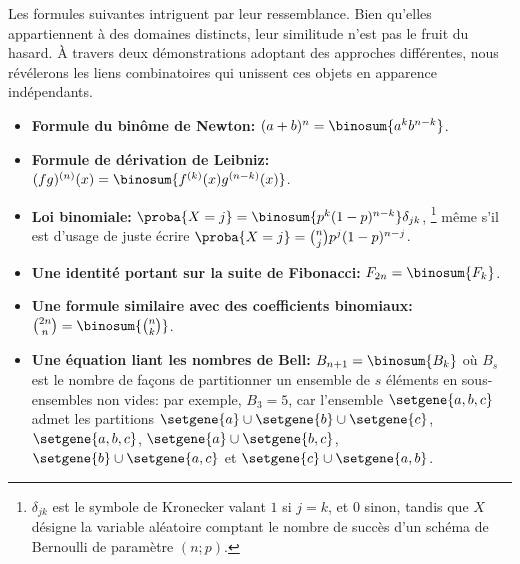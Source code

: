 Les formules suivantes intriguent par leur ressemblance. Bien qu'elles appartiennent à des domaines distincts, leur similitude n’est pas le fruit du hasard. À travers deux démonstrations adoptant des approches différentes, nous révélerons les liens combinatoires qui unissent ces objets en apparence indépendants.
%
\begin{itemize}
    \item \textbf{Formule du binôme de Newton:}
    $(a + b)^n = \binosum{a^k b^{n-k}}$.


    \item \textbf{Formule de dérivation de Leibniz:}
    $(fg)^{(n)}(x) = \binosum{f^{(k)}(x) g^{(n-k)}(x)}$.


    \item \textbf{Loi binomiale:}
    $\proba{X = j} = \binosum{p^k (1 - p)^{n-k}} \delta_{jk}$,%
    \footnote{
    	$\delta_{jk}$ est le symbole de Kronecker valant $1$ si $j=k$, et $0$ sinon,
		tandis que
		$X$ désigne la variable aléatoire comptant le nombre de succès d'un schéma de Bernoulli de paramètre $(n ; p)$.
    }
    même s'il est d'usage de juste écrire
    $\proba{X = j} =\binom{n}{j} p^j (1 - p)^{n-j}$.


    \item \textbf{Une identité portant sur la suite de Fibonacci:}
    $F_{2n} = \binosum{F_k}$.


    \item \textbf{Une formule similaire avec des coefficients binomiaux:}
    $\binom{2n}{n} = \binosum{\binom{n}{k}}$.


    \item \textbf{Une équation liant les nombres de Bell:}
    $B_{n+1} = \binosum{B_k}$ où $B_s$ est le nombre de façons de partitionner un ensemble de $s$ éléments en sous-ensembles non vides:
	par exemple,
	$B_3 = 5$,
	car l'ensemble $\setgene{ a , b , c }$ admet les partitions
	$\setgene{ a } \cup \setgene{ b } \cup \setgene{ c }$,
	$\setgene{ a , b , c }$,
	$\setgene{ a } \cup \setgene{ b , c }$,
	$\setgene{ b } \cup \setgene{ a , c }$ et
	$\setgene{ c } \cup \setgene{ a , b }$.
\end{itemize}